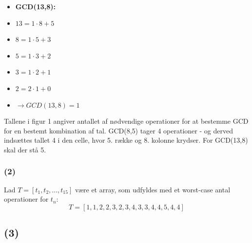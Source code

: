 \documentclass[a4paper,10pt]{article}
\begin{document}
\begin{itemize}
\item{\textbf{GCD(13,8):}}
\item{$13 = 1 \cdot 8 + 5$}
\item{$8 = 1 \cdot 5 + 3$}
\item{$5 = 1 \cdot 3 + 2$}
\item{$3 = 1 \cdot 2 + 1$}
\item{$2 = 2 \cdot 1 + 0$}
\item{$\rightarrow GCD(13,8) = 1$}
\end{itemize}

Tallene i figur 1 angiver antallet af nødvendige operationer for at bestemme GCD for en bestemt kombination af tal. GCD(8,5) tager 4 operationer - og derved indsættes tallet 4 i den celle, hvor 5. række og 8. kolonne krydser. For GCD(13,8) skal der stå 5. 

\subsubsection*{(2)}
Lad $T = [t_{1}, t_{2},...,t_{15}]$ være et array, som udfyldes med et worst-case antal operationer for $t_{n}$:
$$
T = [1, 1, 2, 2, 3, 2, 3, 4, 3, 3, 4, 4, 5, 4, 4]
$$

\subsection*{(3)}
\end{document}
